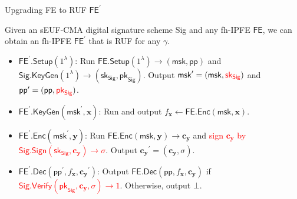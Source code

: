 \begin{frame}{Upgrading \textsf{FE} to RUF $\textsf{FE}^\prime$}

\begin{theorem}
	Given an sEUF-CMA digital signature scheme \textsf{Sig} and any fh-IPFE $\textsf{FE}$, we can obtain an fh-IPFE $\textsf{FE}^\prime$ that is RUF for any $\gamma$.
\end{theorem}

\begin{itemize}

	\item<1-> $\textsf{FE}^\prime \textsf{.Setup}(1^\lambda)$: Run $\textsf{FE.Setup}(1^\lambda) \to (\textsf{msk}, \textsf{pp})$ and $\textsf{Sig.KeyGen}(1^\lambda) \to (\textsf{sk}_{\textsf{Sig}}, \textsf{pk}_{\textsf{Sig}} )$. Output $\textsf{msk}^\prime = (\textsf{msk}, \textcolor{red}{\textsf{sk}_{\textsf{Sig}}} )$ and $\textsf{pp}^\prime = (\textsf{pp}, \textcolor{red}{ \textsf{pk}_{\textsf{Sig}} } )$.

	\item<2-> $\textsf{FE}^\prime \textsf{.KeyGen}(\textsf{msk}^\prime, \mathbf{x})$: Run and output $f_{\mathbf{x}} \gets \textsf{FE.Enc}(\textsf{msk}, \mathbf{x})$.

	\item<3-> $\textsf{FE}^\prime \textsf{.Enc}(\textsf{msk}^\prime, \mathbf{y})$: Run $\textsf{FE.Enc}(\textsf{msk}, \mathbf{y}) \to \mathbf{c_y}$ and \textcolor{red}{sign $\mathbf{c_y}$ by $\textsf{Sig.Sign}(\textsf{sk}_{\textsf{Sig}}, \mathbf{c_y}) \to \sigma$}. Output $\mathbf{c_y}^\prime = (\mathbf{c_y}, \sigma)$.

	\item<4-> $\textsf{FE}^\prime \textsf{.Dec}(\textsf{pp}^\prime, f_\mathbf{x}, \mathbf{c_y}^\prime )$: Output $\textsf{FE.Dec}(\textsf{pp}, f_\mathbf{x}, \mathbf{c_y})$ if \textcolor{red}{ $\textsf{Sig.Verify}(\textsf{pk}_{\textsf{Sig}}, \mathbf{c_y}, \sigma ) \to 1$}. Otherwise, output $\bot$.

\end{itemize}

\end{frame}


